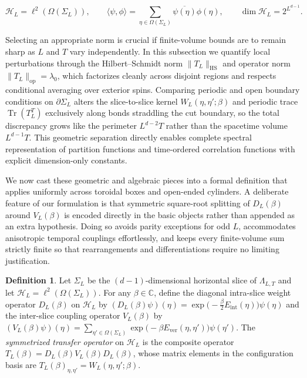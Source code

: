 \documentclass[11pt]{article}
\theoremstyle{definition}
\newtheorem{definition}[theorem]{Definition}
\begin{document}
\[
  \mathcal{H}_L = \ell^2(\Omega(\Sigma_L)), \qquad \langle \psi, \phi \rangle = \sum_{\eta \in \Omega(\Sigma_L)} \overline{\psi(\eta)} \phi(\eta), \qquad \dim \mathcal{H}_L = 2^{L^{d-1}}.
\]

Selecting an appropriate norm is crucial if finite-volume bounds are to remain sharp
as $L$ and $T$ vary independently. In this subsection we quantify local
perturbations through the Hilbert--Schmidt norm $\|T_L\|_{\mathrm{HS}}$ and operator
norm $\|T_L\|_{\mathrm{op}} = \lambda_0$, which factorizes cleanly across disjoint
regions and respects conditional averaging over exterior spins. Comparing periodic
and open boundary conditions on $\partial \Sigma_L$ alters the slice-to-slice kernel
$W_L(\eta, \eta'; \beta)$ and periodic trace $\operatorname{Tr}(T_L^T)$ exclusively
along bonds straddling the cut boundary, so the total discrepancy grows like the
perimeter $L^{d-2} T$ rather than the spacetime volume $L^{d-1} T$. This geometric
separation directly enables complete spectral representation of partition functions
and time-ordered correlation functions with explicit dimension-only constants.

We now cast these geometric and algebraic pieces into a formal definition that
applies uniformly across toroidal boxes and open-ended cylinders. A deliberate
feature of our formulation is that symmetric square-root splitting of $D_L(\beta)$
around $V_L(\beta)$ is encoded directly in the basic objects rather than appended as
an extra hypothesis. Doing so avoids parity exceptions for odd $L$, accommodates
anisotropic temporal couplings effortlessly, and keeps every finite-volume sum
strictly finite so that rearrangements and differentiations require no limiting
justification.

\begin{definition}
\label{def:s05-transfer-op}
Let $\Sigma_L$ be the $(d-1)$-dimensional horizontal slice of $\Lambda_{L,T}$ and
let $\mathcal{H}_L = \ell^2(\Omega(\Sigma_L))$. For any $\beta \in \mathbb{C}$,
define the diagonal intra-slice weight operator $D_L(\beta)$ on $\mathcal{H}_L$ by
$(D_L(\beta) \psi)(\eta) = \exp\!\bigl(-\frac{\beta}{2} E_{\mathrm{int}}(\eta)\bigr)
\psi(\eta)$ and the inter-slice coupling operator $V_L(\beta)$ by $(V_L(\beta)
\psi)(\eta) = \sum_{\eta' \in \Omega(\Sigma_L)} \exp\!\bigl(-\beta
E_{\mathrm{ver}}(\eta, \eta')\bigr) \psi(\eta')$. The \emph{symmetrized transfer
operator} on $\mathcal{H}_L$ is the composite operator $T_L(\beta) = D_L(\beta)
V_L(\beta) D_L(\beta)$, whose matrix elements in the configuration basis are
$T_L(\beta)_{\eta, \eta'} = W_L(\eta, \eta'; \beta)$.
\end{definition}
\end{document}
